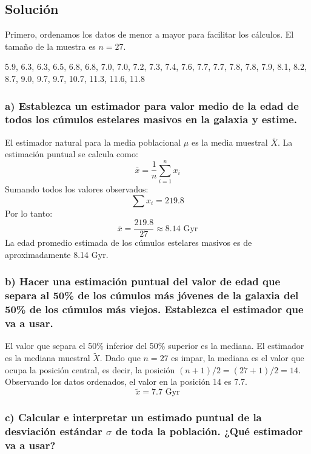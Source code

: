 \documentclass[12pt]{article}
\begin{document}
\subsection{Solución}

Primero, ordenamos los datos de menor a mayor para facilitar los cálculos. El tamaño de la muestra es $n=27$.
\begin{center}
    5.9, 6.3, 6.3, 6.5, 6.8, 6.8, 7.0, 7.0, 7.2, 7.3, 7.4, 7.6, 7.7, 7.7, 7.8, 7.8, 7.9, 8.1, 8.2, 8.7, 9.0, 9.7, 9.7, 10.7, 11.3, 11.6, 11.8
\end{center}

\subsubsection*{a) Establezca un estimador para valor medio de la edad de todos los cúmulos estelares masivos en la galaxia y estime.}

El estimador natural para la media poblacional $\mu$ es la media muestral $\bar{X}$.
La estimación puntual se calcula como:
$$ \bar{x} = \frac{1}{n} \sum_{i=1}^{n} x_i $$
Sumando todos los valores observados:
$$ \sum x_i = 219.8 $$
Por lo tanto:
$$ \bar{x} = \frac{219.8}{27} \approx 8.14 \text{ Gyr} $$
La edad promedio estimada de los cúmulos estelares masivos es de aproximadamente 8.14 Gyr.

\subsubsection*{b) Hacer una estimación puntual del valor de edad que separa al 50\% de los cúmulos más jóvenes de la galaxia del 50\% de los cúmulos más viejos. Establezca el estimador que va a usar.}

El valor que separa el 50\% inferior del 50\% superior es la mediana. El estimador es la mediana muestral $\tilde{X}$.
Dado que $n=27$ es impar, la mediana es el valor que ocupa la posición central, es decir, la posición $(n+1)/2 = (27+1)/2 = 14$.
Observando los datos ordenados, el valor en la posición 14 es 7.7.
$$ \tilde{x} = 7.7 \text{ Gyr} $$

\subsubsection*{c) Calcular e interpretar un estimado puntual de la desviación estándar $\sigma$ de toda la población. ¿Qué estimador va a usar?}
\end{document}
